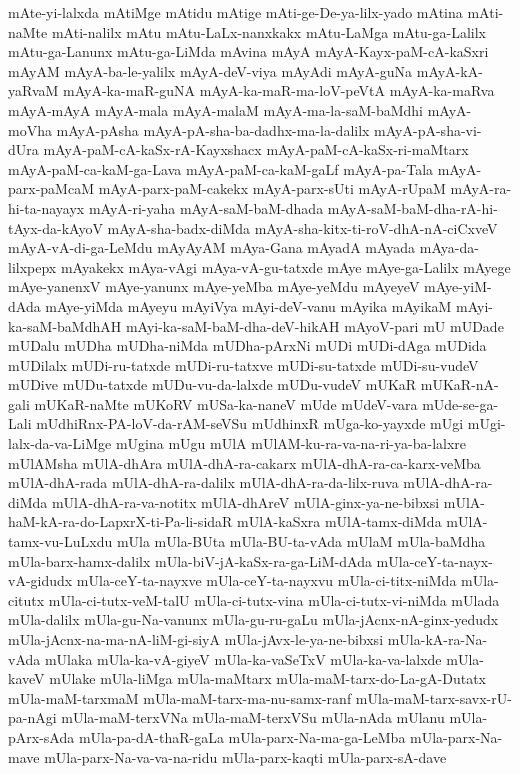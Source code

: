 {mAte-yi-lalxda
mAtiMge
mAtidu
mAtige
mAti-ge-De-ya-lilx-yado
mAtina
mAti-naMte
mAti-nalilx
mAtu
mAtu-LaLx-nanxkakx
mAtu-LaMga
mAtu-ga-Lalilx
mAtu-ga-Lanunx
mAtu-ga-LiMda
mAvina
mAyA
mAyA-Kayx-paM-cA-kaSxri
mAyAM
mAyA-ba-le-yalilx
mAyA-deV-viya
mAyAdi
mAyA-guNa
mAyA-kA-yaRvaM
mAyA-ka-maR-guNA
mAyA-ka-maR-ma-loV-peVtA
mAyA-ka-maRva
mAyA-mAyA
mAyA-mala
mAyA-malaM
mAyA-ma-la-saM-baMdhi
mAyA-moVha
mAyA-pAsha
mAyA-pA-sha-ba-dadhx-ma-la-dalilx
mAyA-pA-sha-vi-dUra
mAyA-paM-cA-kaSx-rA-Kayxshacx
mAyA-paM-cA-kaSx-ri-maMtarx
mAyA-paM-ca-kaM-ga-Lava
mAyA-paM-ca-kaM-gaLf
mAyA-pa-Tala
mAyA-parx-paMcaM
mAyA-parx-paM-cakekx
mAyA-parx-sUti
mAyA-rUpaM
mAyA-ra-hi-ta-nayayx
mAyA-ri-yaha
mAyA-saM-baM-dhada
mAyA-saM-baM-dha-rA-hi-tAyx-da-kAyoV
mAyA-sha-badx-diMda
mAyA-sha-kitx-ti-roV-dhA-nA-ciCxveV
mAyA-vA-di-ga-LeMdu
mAyAyAM
mAya-Gana
mAyadA
mAyada
mAya-da-lilxpepx
mAyakekx
mAya-vAgi
mAya-vA-gu-tatxde
mAye
mAye-ga-Lalilx
mAyege
mAye-yanenxV
mAye-yanunx
mAye-yeMba
mAye-yeMdu
mAyeyeV
mAye-yiM-dAda
mAye-yiMda
mAyeyu
mAyiVya
mAyi-deV-vanu
mAyika
mAyikaM
mAyi-ka-saM-baMdhAH
mAyi-ka-saM-baM-dha-deV-hikAH
mAyoV-pari
mU
mUDade
mUDalu
mUDha
mUDha-niMda
mUDha-pArxNi
mUDi
mUDi-dAga
mUDida
mUDilalx
mUDi-ru-tatxde
mUDi-ru-tatxve
mUDi-su-tatxde
mUDi-su-vudeV
mUDive
mUDu-tatxde
mUDu-vu-da-lalxde
mUDu-vudeV
mUKaR
mUKaR-nA-gali
mUKaR-naMte
mUKoRV
mUSa-ka-naneV
mUde
mUdeV-vara
mUde-se-ga-Lali
mUdhiRnx-PA-loV-da-rAM-seVSu
mUdhinxR
mUga-ko-yayxde
mUgi
mUgi-lalx-da-va-LiMge
mUgina
mUgu
mUlA
mUlAM-ku-ra-va-na-ri-ya-ba-lalxre
mUlAMsha
mUlA-dhAra
mUlA-dhA-ra-cakarx
mUlA-dhA-ra-ca-karx-veMba
mUlA-dhA-rada
mUlA-dhA-ra-dalilx
mUlA-dhA-ra-da-lilx-ruva
mUlA-dhA-ra-diMda
mUlA-dhA-ra-va-notitx
mUlA-dhAreV
mUlA-ginx-ya-ne-bibxsi
mUlA-haM-kA-ra-do-LapxrX-ti-Pa-li-sidaR
mUlA-kaSxra
mUlA-tamx-diMda
mUlA-tamx-vu-LuLxdu
mUla
mUla-BUta
mUla-BU-ta-vAda
mUlaM
mUla-baMdha
mUla-barx-hamx-dalilx
mUla-biV-jA-kaSx-ra-ga-LiM-dAda
mUla-ceY-ta-nayx-vA-gidudx
mUla-ceY-ta-nayxve
mUla-ceY-ta-nayxvu
mUla-ci-titx-niMda
mUla-citutx
mUla-ci-tutx-veM-talU
mUla-ci-tutx-vina
mUla-ci-tutx-vi-niMda
mUlada
mUla-dalilx
mUla-gu-Na-vanunx
mUla-gu-ru-gaLu
mUla-jAcnx-nA-ginx-yedudx
mUla-jAcnx-na-ma-nA-liM-gi-siyA
mUla-jAvx-le-ya-ne-bibxsi
mUla-kA-ra-Na-vAda
mUlaka
mUla-ka-vA-giyeV
mUla-ka-vaSeTxV
mUla-ka-va-lalxde
mUla-kaveV
mUlake
mUla-liMga
mUla-maMtarx
mUla-maM-tarx-do-La-gA-Dutatx
mUla-maM-tarxmaM
mUla-maM-tarx-ma-nu-samx-ranf
mUla-maM-tarx-savx-rU-pa-nAgi
mUla-maM-terxVNa
mUla-maM-terxVSu
mUla-nAda
mUlanu
mUla-pArx-sAda
mUla-pa-dA-thaR-gaLa
mUla-parx-Na-ma-ga-LeMba
mUla-parx-Na-mave
mUla-parx-Na-va-va-na-ridu
mUla-parx-kaqti
mUla-parx-sA-dave
}
